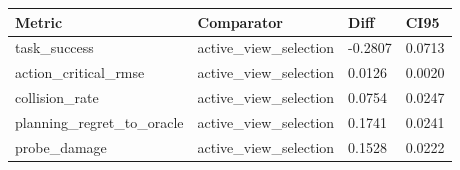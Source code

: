 \begin{tabular}{llll}
\toprule
Metric & Comparator & Diff & CI95 \\
\midrule
task\_success & active\_view\_selection & -0.2807 & 0.0713 \\
action\_critical\_rmse & active\_view\_selection & 0.0126 & 0.0020 \\
collision\_rate & active\_view\_selection & 0.0754 & 0.0247 \\
planning\_regret\_to\_oracle & active\_view\_selection & 0.1741 & 0.0241 \\
probe\_damage & active\_view\_selection & 0.1528 & 0.0222 \\
\bottomrule
\end{tabular}
